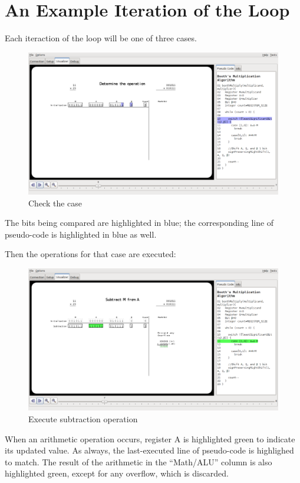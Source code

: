 \documentclass{article}
\begin{document}
\pagebreak
\section{An Example Iteration of the Loop}
Each iteraction of the loop will be one of three cases.

\begin{figure}[h]
\centering
\includegraphics[scale=0.3]{cases.pdf}
\caption{Check the case}
\end{figure}

The bits being compared are highlighted in blue; the corresponding line of pseudo-code is highlighted in blue as well.

\pagebreak
Then the operations for that case are executed:

\begin{figure}[h]
\centering
\includegraphics[scale=0.3]{sub.pdf}
\caption{Execute subtraction operation}
\end{figure}

When an arithmetic operation occurs, register A is highlighted green to indicate its updated value.
As always, the last-executed line of pseudo-code is highlighed to match.
The result of the arithmetic in the ``Math/ALU'' column is also highlighted green, except for any overflow, which is discarded.
\end{document}
